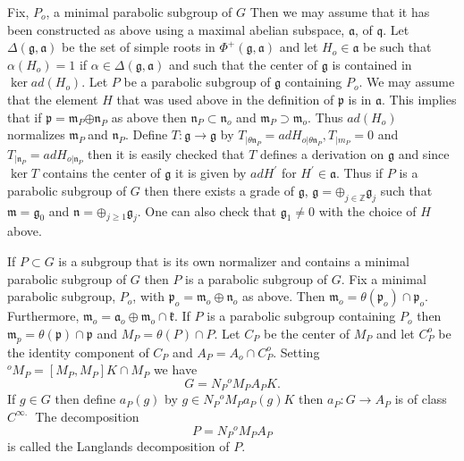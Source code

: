 \documentclass[12pt]{article}%
\begin{document}
Fix, $P_{o}$, a minimal parabolic subgroup of $G$ Then we may assume that it
has been constructed as above using a maximal abelian subspace, $\mathfrak{a}
$, of $\mathfrak{q}$. Let $\Delta(\mathfrak{g},\mathfrak{a})$ be the set of
simple roots in $\Phi^{+}(\mathfrak{g},\mathfrak{a})$ and let $H_{o}%
\in\mathfrak{a}$ be such that $\alpha(H_{o})=1$ if $\alpha\in\Delta
(\mathfrak{g},\mathfrak{a})$ and such that the center of $\mathfrak{g}$ is
contained in $\ker ad(H_{o}).$ Let $P$ be a parabolic subgroup of
$\mathfrak{g}$ containing $P_{o}$. We may assume that the element $H$ that was
used above in the definition of $\mathfrak{p}$ is in $\mathfrak{a}$. This
implies that if $\mathfrak{p}=\mathfrak{m}_{P}\mathfrak{\oplus n}_{P}$ as
above then $\mathfrak{n}_{P}\subset\mathfrak{n}_{o}$ and $\mathfrak{m}%
_{P}\supset\mathfrak{m}_{o}$. Thus $ad(H_{o})$ normalizes $\mathfrak{m}%
_{P}\mathfrak{\ } $and $\mathfrak{n}_{P}$. Define $T:\mathfrak{g}%
\rightarrow\mathfrak{g}$ by $T_{|\theta\mathfrak{n}_{P}}=adH_{o|\theta
\mathfrak{n}_{P}},T_{|m_{P}}=0$ and $T_{|\mathfrak{n}_{P}}=adH_{o|\mathfrak{n}%
_{P}}$ then it is easily checked that $T$ defines a derivation on
$\mathfrak{g}$ and since $\ker T$ contains the center of $\mathfrak{g}$ it is
given by $adH^{\prime}$ for $H^{\prime}\in\mathfrak{a.}$ Thus if $P$ is a
parabolic subgroup of $G$ then there exists a grade of $\mathfrak{g}$,
$\mathfrak{g=\oplus}_{j\in\mathbb{Z}}\mathfrak{g}_{j}$ such that
$\mathfrak{m=\mathfrak{g}}_{0}$ and $\mathfrak{n=\oplus}_{j\geq1}%
\mathfrak{g}_{j}$. One can also check that $\mathfrak{g}_{1}\neq0$ with the
choice of $H$ above.

If $P\subset G$ is a subgroup that is its own normalizer and contains a
minimal parabolic subgroup of $G$ then $P$ is a parabolic subgroup of $G$. Fix
a minimal parabolic subgroup, $P_{o}$, with $\mathfrak{p}_{o}=\mathfrak{m}%
_{o}\oplus\mathfrak{n}_{o}$ as above. Then $\mathfrak{m}_{o}=\theta
(\mathfrak{p}_{o})\cap\mathfrak{p}_{o}$. Furthermore, $\mathfrak{m}%
_{o}=\mathfrak{a}_{o}\oplus\mathfrak{m}_{o}\cap\mathfrak{k}$. If $P$ is a
parabolic subgroup containing $P_{o}$ then $\mathfrak{m}_{p}=\theta\left(
\mathfrak{p}\right)  \cap\mathfrak{p}$ and $M_{P}=\theta(P)\cap P$. Let
$C_{P}$ be the center of $M_{P}$ and let $C_{P}^{o}$ be the identity component
of $C_{P}$ and $A_{P}=A_{o}\cap C_{P}^{o}$. Setting ${}^{o}M_{P}=[M_{P}%
,M_{P}]K\cap M_{P}$ we have%
\[
G=N_{P}{}^{o}M_{P}A_{P}K.
\]
If $g\in G$ then define $a_{P}(g)$ by $g\in N_{P}{}^{o}M_{P}a_{P}(g)K$ then
$a_{P}:G\rightarrow A_{P}$ is of class $C^{\infty\text{. }}$ The
decomposition
\[
P=N_{P}{}^{o}M_{P}A_{P}
\]
is called the Langlands decomposition of $P$.
\end{document}
